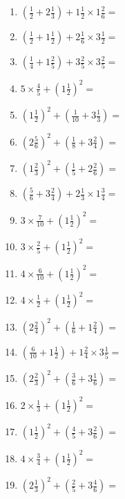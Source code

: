 \documentclass[12pt]{article}
\begin{document}
\begin{enumerate}
\item \large $ (\frac{1}{2} + 2 \frac{1}{3}) + 1 \frac{1}{2} \times 1 \frac{2}{6} = $ \vspace{1.8cm}
\item \large $ (\frac{1}{2} + 1 \frac{1}{2}) + 2 \frac{1}{6} \times 3 \frac{1}{2} = $ \vspace{1.8cm}
\item \large $ (\frac{1}{4} + 1 \frac{2}{5}) + 3 \frac{2}{5} \times 3 \frac{2}{5} = $ \vspace{1.8cm}
\item \large $ 5 \times \frac{4}{5} + (1 \frac{1}{2})^2 = $ \vspace{1.8cm}
\item \large $ (1 \frac{1}{2})^2 + (\frac{1}{10} + 3 \frac{1}{3}) = $ \vspace{1.8cm}
\item \large $ (2 \frac{5}{6})^2 + (\frac{1}{8} + 3 \frac{2}{4}) = $ \vspace{1.8cm}
\item \large $ (1 \frac{2}{3})^2 + (\frac{1}{5} + 2 \frac{2}{6}) = $ \vspace{1.8cm}
\item \large $ (\frac{5}{6} + 3 \frac{2}{4}) + 2 \frac{1}{3} \times 1 \frac{3}{4} = $ \vspace{1.8cm}
\item \large $ 3 \times \frac{7}{10} + (1 \frac{1}{2})^2 = $ \vspace{1.8cm}
\newpage
\item \large $ 3 \times \frac{2}{5} + (1 \frac{1}{2})^2 = $ \vspace{1.8cm}
\item \large $ 4 \times \frac{6}{10} + (1 \frac{1}{2})^2 = $ \vspace{1.8cm}
\item \large $ 4 \times \frac{1}{2} + (1 \frac{1}{2})^2 = $ \vspace{1.8cm}
\item \large $ (2 \frac{2}{4})^2 + (\frac{1}{6} + 1 \frac{2}{4}) = $ \vspace{1.8cm}
\item \large $ (\frac{6}{10} + 1 \frac{1}{2}) + 1 \frac{2}{4} \times 3 \frac{1}{5} = $ \vspace{1.8cm}
\item \large $ (2 \frac{2}{3})^2 + (\frac{3}{6} + 3 \frac{1}{6}) = $ \vspace{1.8cm}
\item \large $ 2 \times \frac{1}{3} + (1 \frac{1}{2})^2 = $ \vspace{1.8cm}
\item \large $ (1 \frac{1}{2})^2 + (\frac{4}{5} + 3 \frac{2}{6}) = $ \vspace{1.8cm}
\item \large $ 4 \times \frac{3}{4} + (1 \frac{1}{2})^2 = $ \vspace{1.8cm}
\item \large $ (2 \frac{1}{3})^2 + (\frac{2}{5} + 3 \frac{4}{6}) = $ \vspace{1.8cm}
\end{enumerate}\newpage
\end{document}
